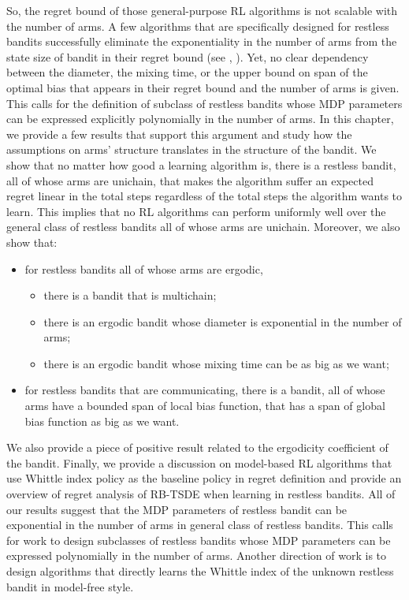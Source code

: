 So, the regret bound of those general-purpose RL algorithms is not scalable with the number of arms.
A few algorithms that are specifically designed for restless bandits successfully eliminate the exponentiality in the number of arms from the state size of bandit in their regret bound (see \eg, \cite{ortner2012regret, jung2019thompson, akbarzadeh2022learning}).
Yet, no clear dependency between the diameter, the mixing time, or the upper bound on span of the optimal bias that appears in their regret bound and the number of arms is given.
This calls for the definition of subclass of restless bandits whose MDP parameters can be expressed explicitly polynomially in the number of arms.
In this chapter, we provide a few results that support this argument and study how the assumptions on arms' structure translates in the structure of the bandit.
We show that no matter how good a learning algorithm is, there is a restless bandit, all of whose arms are unichain, that makes the algorithm suffer an expected regret linear in the total steps regardless of the total steps the algorithm wants to learn.
This implies that no RL algorithms can perform uniformly well over the general class of restless bandits all of whose arms are unichain. 
Moreover, we also show that:
\begin{itemize}
    \item for restless bandits all of whose arms are ergodic,
        \begin{itemize}
            \item there is a bandit that is multichain;
            \item there is an ergodic bandit whose diameter is exponential in the number of arms;
            \item there is an ergodic bandit whose mixing time can be as big as we want;
        \end{itemize}
    \item for restless bandits that are communicating, there is a bandit, all of whose arms have a bounded span of local bias function, that has a span of global bias function as big as we want.
\end{itemize}
We also provide a piece of positive result related to the ergodicity coefficient of the bandit.
Finally, we provide a discussion on model-based RL algorithms that use Whittle index policy as the baseline policy in regret definition and provide an overview of regret analysis of RB-TSDE \cite{akbarzadeh2022learning} when learning in restless bandits.
All of our results suggest that the MDP parameters of restless bandit can be exponential in the number of arms in general class of restless bandits.
This calls for work to design subclasses of restless bandits whose MDP parameters can be expressed polynomially in the number of arms.
Another direction of work is to design algorithms that directly learns the Whittle index of the unknown restless bandit in model-free style.

